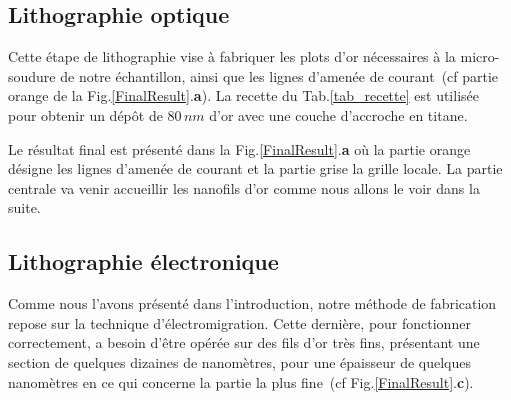 \subsection{Lithographie optique}

Cette étape de lithographie vise à fabriquer les plots d'or nécessaires à la micro-soudure de notre échantillon, ainsi que les lignes d'amenée de courant~(cf partie orange de la Fig.\ref{FinalResult}.\textbf{a}). La recette du Tab.\ref{tab_recette}  est utilisée pour obtenir un dép\^ot de 80$\,nm$ d'or avec une couche d'accroche en titane.

Le résultat final est présenté dans la Fig.\ref{FinalResult}.\textbf{a} où la partie orange désigne les lignes d'amenée de courant et la partie grise la grille locale. La partie centrale va venir accueillir les nanofils d'or comme nous allons le voir dans la suite.


\subsection{Lithographie électronique}



Comme nous l'avons présenté dans l'introduction, notre méthode de fabrication repose sur la technique d'électromigration. Cette dernière, pour fonctionner correctement, a besoin d'\^etre opérée sur des fils d'or très fins, présentant une section de quelques dizaines de nanomètres, pour une épaisseur de quelques nanomètres en ce qui concerne la partie la plus fine~(cf Fig.\ref{FinalResult}.\textbf{c}). 

